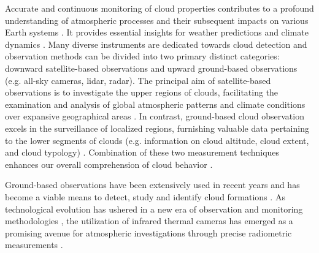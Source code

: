 \documentclass[amt, article]{copernicus}
\begin{document}
Accurate and continuous monitoring of cloud properties contributes to a profound understanding of atmospheric processes and their subsequent impacts on various Earth systems \citep{liou1992radiation}. It provides essential insights for weather predictions and climate dynamics \citep{hu2004application,petzold2015global}.
Many diverse instruments are dedicated towards cloud detection and observation methods can be divided into two primary distinct categories: downward satellite-based observations \citep{roy2017satellite, martin2008satellite} and upward ground-based observations \citep{wilczak1996ground} (e.g. all-sky cameras, lidar, radar). The principal aim of satellite-based observations is to investigate the upper regions of clouds, facilitating the examination and analysis of global atmospheric patterns and climate conditions over expansive geographical areas \citep{schiffer1983international, boers2006satellite, geer2017growing, varnai2018satellite}. In contrast, ground-based cloud observation excels in the surveillance of localized regions, furnishing valuable data pertaining to the lower segments of clouds (e.g. information on cloud altitude, cloud extent, and cloud typology) \citep{bower2000ace, zhou2019cloud}. Combination of these two measurement techniques enhances our overall comprehension of cloud behavior \citep{mokhov1994analysis, schreiner1993comparison, yamashita2012ground, yoshimura2013contribution}.

Ground-based observations have been extensively used in recent years and has become a viable means to detect, study and identify cloud formations \citep{paczynski2000monitoring, skidmore2008using, tzoumanikas2016effect, ugolnikov2017noctilucent, Mommert2020, tzoumanikas2016effect, roman2022retrieval}. As technological evolution has ushered in a new era of observation and monitoring methodologies \citep{mandat2014all}, the utilization of infrared thermal cameras has emerged as a promising avenue for atmospheric investigations through precise radiometric measurements \citep{Szejwach1982, Shaw_2013, liandrat2017cloud, lopez2017contribution, Klebe2014, nikolenko2021infrared}.
\end{document}
